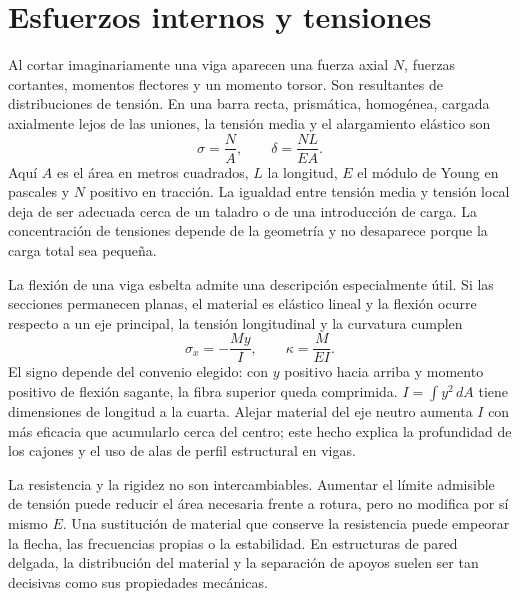 \section{Esfuerzos internos y tensiones}
Al cortar imaginariamente una viga aparecen una fuerza axial $N$, fuerzas cortantes, momentos flectores y un momento torsor. Son resultantes de distribuciones de tensión. En una barra recta, prismática, homogénea, cargada axialmente lejos de las uniones, la tensión media y el alargamiento elástico son
\begin{equation}
 \sigma=\frac{N}{A},\qquad \delta=\frac{NL}{EA}.
\end{equation}
Aquí $A$ es el área en metros cuadrados, $L$ la longitud, $E$ el módulo de Young en pascales y $N$ positivo en tracción. La igualdad entre tensión media y tensión local deja de ser adecuada cerca de un taladro o de una introducción de carga. La concentración de tensiones depende de la geometría y no desaparece porque la carga total sea pequeña.

La flexión de una viga esbelta admite una descripción especialmente útil. Si las secciones permanecen planas, el material es elástico lineal y la flexión ocurre respecto a un eje principal, la tensión longitudinal y la curvatura cumplen
\begin{equation}
 \sigma_x=-\frac{My}{I},\qquad \kappa=\frac{M}{EI}.
\end{equation}
El signo depende del convenio elegido: con $y$ positivo hacia arriba y momento positivo de flexión sagante, la fibra superior queda comprimida. $I=\int y^2\,dA$ tiene dimensiones de longitud a la cuarta. Alejar material del eje neutro aumenta $I$ con más eficacia que acumularlo cerca del centro; este hecho explica la profundidad de los cajones y el uso de alas de perfil estructural en vigas.

La resistencia y la rigidez no son intercambiables. Aumentar el límite admisible de tensión puede reducir el área necesaria frente a rotura, pero no modifica por sí mismo $E$. Una sustitución de material que conserve la resistencia puede empeorar la flecha, las frecuencias propias o la estabilidad. En estructuras de pared delgada, la distribución del material y la separación de apoyos suelen ser tan decisivas como sus propiedades mecánicas.


